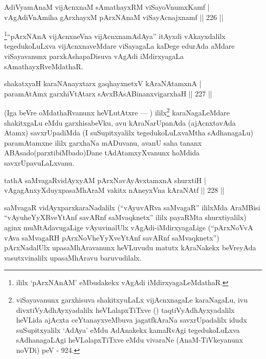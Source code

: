 \begin{shl}
AdiVyamAnaM vijAcnxnaM sAmathayxRM viSayoVnumxKamf |\\
vAgAdiVnAmiha gArxhayxM pArxNAnaM viSayAcnajxnamf \hfill || 226 ||
\end{shl}

\begin{artha}
\footnote{ililx `pArxNAnAM' eMbudakekx vAgAdi  iMdirxyagaLeMdathaR.}``pArxNAnA vijAcnxneVna vijAcnxnamAdAya'' itAyxdi vAkayxdalilx tegedukoLuLxva vijAcnxnaveMdare viSayagaLa kaDege edurAda aMdare viSayavanunx parxkAshapaDisuva vAgAdi iMdirxyagaLa sAmathayxRveMdathaR.
\end{artha}

\begin{shl}
shakatxyaH karaNAnayxtarx gaqhayxnetxV kAraNAtamxnA |\\
paramAtAmx garxhiVtA\s tarx sAvxBAsABinanxvigarxhaH \hfill || 227 ||
\end{shl}

\begin{artha}
(Iga beVre oMdathaRvanunx heVLutAtxre {\rm ---} ) ililx\footnote{viSayavanunx garxhisuva shakitxyuLaLx vijAcnxnagaLe karaNagaLu, ivu divxtiVyAdhAyxyadalilx heVLalapxTiTxve (\quad) taqtiVyAdhAyxyadalilx heVLida ajAcxta ceYtanayxveMbuva jagatfkAraNa savxrUpadalilx idudx suSupitxyalilx `AdAya' eMdu AdAnakekx kamaRvAgi tegedukoLuLxva sAdhanagaLAgi heVLalapxTiTxve eMdu vivaraNe (AnaM-TiVkeyanunx noVDi) peV - 924.} karaNagaLeMdare shakitxgaLu eMdu garxhisabeVku, avu kAraNarUpanAda (ajAcnxtavAda Atamx) savxrUpadiMda (I suSupitxyalilx tegedukoLuLxvaMtha sAdhanagaLu) paramAtamxne ililx garxhaNa mADuvanu, avanU saha tananx ABAsado(parxtibiMbado)Dane tAdAtamxyXvanunx hoMdida savxrUpavuLaLxvanu.
\end{artha}


\begin{shl}
tathA saMvagaRvidAyxyAM pArxNavAyAvxtamxnA shurxtiH |\\
vAgagAnxyXduyxpasaMhAraM vakitx nAneyxVna kAraNAtf \hfill || 228 ||
\end{shl}

\begin{artha}
saMvagaR vidAyxparxkaraNadalilx (``vAyuvARva saMvagaR'' ililxMda AraMBisi ``vAyuheYyXRveYtAnf savARnf saMvaqknetx'' ililx payaRMta shurxtiyalilx) aginx muMtAdavugaLige vAyuvinalUlx vAgAdi-iMdirxyagaLige (``pArxNoVvA vAva saMvagaRH pArxNoVheYyXveYtAnf savARnf saMvaqknetx'') pArxNadalUlx upasaMhAravanunx heVLuvudu matutx kAraNakekx beVreyAda vasutxvinalilx upasaMhAravu baruvudilalx.
\end{artha}

